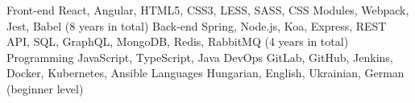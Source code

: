 

\begin{cvskills}

  \cvskill
    {Front-end} %
    {React, Angular, HTML5, CSS3, LESS, SASS, CSS Modules, Webpack, Jest, Babel (8 years in total)} %
  \cvskill
    {Back-end} %
    {Spring, Node.js, Koa, Express, REST API, SQL, GraphQL, MongoDB, Redis, RabbitMQ (4 years in total)} %
  \cvskill
    {Programming} %
    {JavaScript, TypeScript, Java} %
  \cvskill
    {DevOps} %
    {GitLab, GitHub, Jenkins, Docker, Kubernetes, Ansible} %
  \cvskill
    {Languages} %
    {Hungarian, English, Ukrainian, German (beginner level)} %

\end{cvskills}
